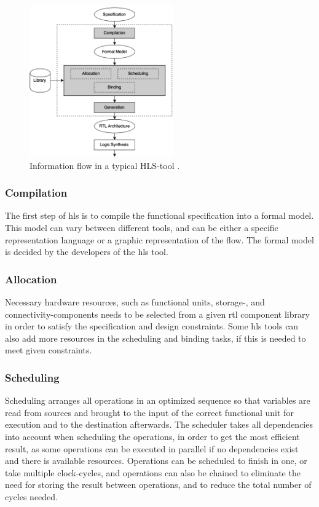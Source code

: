 \begin{figure}[hbpt]
\centering
\includegraphics[width=0.55\textwidth]{../figs/HLSFlow.png}
\caption{\label{fig:hlsflow}Information flow in a typical HLS-tool \cite{coussy2009introduction}.}
\end{figure}

\subsubsection{Compilation}

The first step of \gls{hls} is to compile the functional specification into a formal model. This model can vary between different tools, and can be either a specific representation language or a graphic representation of the flow. The formal model is decided by the developers of the \gls{hls} tool. 

\subsubsection{Allocation}

Necessary hardware resources, such as functional units, storage-, and connectivity-components needs to be selected from a given \gls{rtl} component library in order to satisfy the specification and design constraints. Some \gls{hls} tools can also add more resources in the scheduling and binding tasks, if this is needed to meet given constraints.

\subsubsection{Scheduling}
Scheduling arranges all operations in an optimized sequence so that variables are read from sources and brought to the input of the correct functional unit for execution and to the destination afterwards. The scheduler takes all dependencies into account when scheduling the operations, in order to get the most efficient result, as some operations can be executed in parallel if no dependencies exist and there is available resources. Operations can be scheduled to finish in one, or take multiple clock-cycles, and operations can also be chained to eliminate the need for storing the result between operations, and to reduce the total number of cycles needed. 
